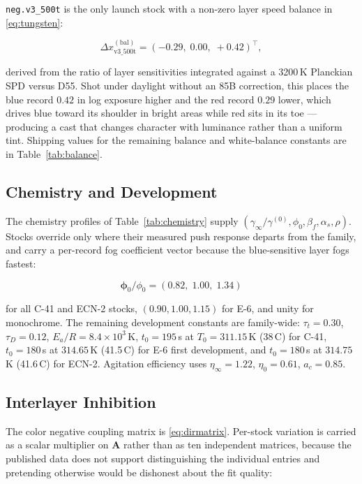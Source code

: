 \texttt{neg.v3\_500t} is the only launch stock with a non-zero layer speed
balance in \eqref{eq:tungsten}:

\begin{equation}
\Delta x^{\mathrm{(bal)}}_{\mathrm{v3\_500t}} = (-0.29,\; 0.00,\; +0.42)^\top ,
\end{equation}

derived from the ratio of layer sensitivities integrated against a 3200\,K
Planckian SPD versus D55. Shot under daylight without an 85B correction, this
places the blue record $0.42$ in log exposure higher and the red record $0.29$
lower, which drives blue toward its shoulder in bright areas while red sits in
its toe --- producing a cast that changes character with luminance rather than
a uniform tint. Shipping values for the remaining balance and white-balance
constants are in Table~\ref{tab:balance}.

\subsection{Chemistry and Development}

The chemistry profiles of Table~\ref{tab:chemistry} supply $(\gamma_\infty /
\gamma^{(0)}, \phi_0, \beta_f, \alpha_s, \rho)$. Stocks override only where
their measured push response departs from the family, and carry a per-record
fog coefficient vector because the blue-sensitive layer fogs fastest:

\begin{equation}
\boldsymbol{\phi}_0 / \phi_0 = (0.82,\; 1.00,\; 1.34)
\end{equation}

for all C-41 and ECN-2 stocks, $(0.90, 1.00, 1.15)$ for E-6, and unity for
monochrome. The remaining development constants are family-wide: $\tau_t =
0.30$, $\tau_D = 0.12$, $E_a/R = 8.4\times10^{3}$\,K, $t_0 = 195$\,s at $T_0 =
311.15$\,K (38\,\textdegree C) for C-41, $t_0 = 180$\,s at $314.65$\,K
(41.5\,\textdegree C) for E-6 first development, and $t_0 = 180$\,s at
$314.75$\,K (41.6\,\textdegree C) for ECN-2. Agitation efficiency uses
$\eta_\infty = 1.22$, $\eta_0 = 0.61$, $a_c = 0.85$.

\subsection{Interlayer Inhibition}

The color negative coupling matrix is \eqref{eq:dirmatrix}. Per-stock variation
is carried as a scalar multiplier on $\mathbf{A}$ rather than as ten
independent matrices, because the published data does not support
distinguishing the individual entries and pretending otherwise would be
dishonest about the fit quality:

